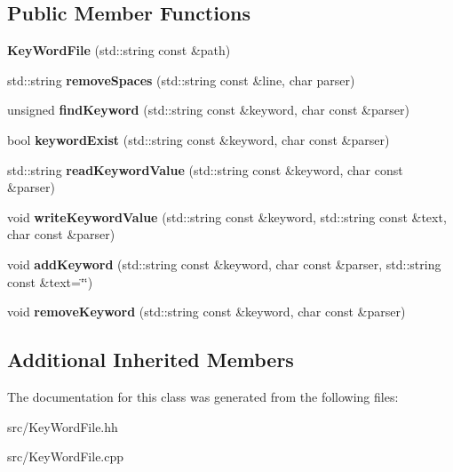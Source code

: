 \subsection*{Public Member Functions}
\begin{DoxyCompactItemize}
\item 
\hypertarget{classstb_1_1KeyWordFile_ad1f766f05a47b5f30452ee332b29c219}{{\bfseries Key\+Word\+File} (std\+::string const \&path)}\label{classstb_1_1KeyWordFile_ad1f766f05a47b5f30452ee332b29c219}

\item 
\hypertarget{classstb_1_1KeyWordFile_aa7512ba0707c860b9d0b6602963e48f7}{std\+::string {\bfseries remove\+Spaces} (std\+::string const \&line, char parser)}\label{classstb_1_1KeyWordFile_aa7512ba0707c860b9d0b6602963e48f7}

\item 
\hypertarget{classstb_1_1KeyWordFile_a0f04003a1d61093ad26e1daab5854b42}{unsigned {\bfseries find\+Keyword} (std\+::string const \&keyword, char const \&parser)}\label{classstb_1_1KeyWordFile_a0f04003a1d61093ad26e1daab5854b42}

\item 
\hypertarget{classstb_1_1KeyWordFile_a79b3bdde8435b7a08303b9d24d76daad}{bool {\bfseries keyword\+Exist} (std\+::string const \&keyword, char const \&parser)}\label{classstb_1_1KeyWordFile_a79b3bdde8435b7a08303b9d24d76daad}

\item 
\hypertarget{classstb_1_1KeyWordFile_a9ad118c931c758eb82234c1eecbf3c74}{std\+::string {\bfseries read\+Keyword\+Value} (std\+::string const \&keyword, char const \&parser)}\label{classstb_1_1KeyWordFile_a9ad118c931c758eb82234c1eecbf3c74}

\item 
\hypertarget{classstb_1_1KeyWordFile_a596255b1b9b04e8debbbc7c1c305974b}{void {\bfseries write\+Keyword\+Value} (std\+::string const \&keyword, std\+::string const \&text, char const \&parser)}\label{classstb_1_1KeyWordFile_a596255b1b9b04e8debbbc7c1c305974b}

\item 
\hypertarget{classstb_1_1KeyWordFile_aeeaa8e94acd41541f9d503c05cb75c0c}{void {\bfseries add\+Keyword} (std\+::string const \&keyword, char const \&parser, std\+::string const \&text=\char`\"{}\char`\"{})}\label{classstb_1_1KeyWordFile_aeeaa8e94acd41541f9d503c05cb75c0c}

\item 
\hypertarget{classstb_1_1KeyWordFile_a1ee0e68efc459e3f24648047f0e02d8c}{void {\bfseries remove\+Keyword} (std\+::string const \&keyword, char const \&parser)}\label{classstb_1_1KeyWordFile_a1ee0e68efc459e3f24648047f0e02d8c}

\end{DoxyCompactItemize}
\subsection*{Additional Inherited Members}


The documentation for this class was generated from the following files\+:\begin{DoxyCompactItemize}
\item 
src/Key\+Word\+File.\+hh\item 
src/Key\+Word\+File.\+cpp\end{DoxyCompactItemize}
